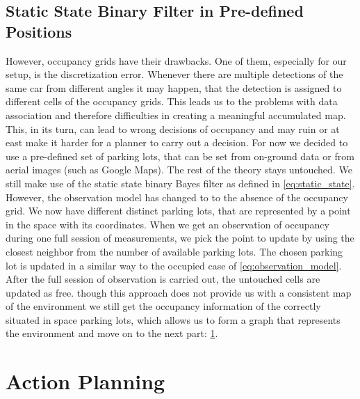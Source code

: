    \subsection{Static State Binary Filter in Pre-defined Positions} %
    \label{sub:static_state_binary_filter_in_pre_defined_positions}
        However, occupancy grids have their drawbacks. One of them, especially for our setup, is the discretization error. Whenever there are multiple detections of the same car from different angles it may happen, that the detection is assigned to different cells of the occupancy grids. This leads us to the problems with data association and therefore difficulties in creating a meaningful accumulated map. This, in its turn, can lead to wrong decisions of occupancy and may ruin or at east make it harder for a planner to carry out a decision.
        For now we decided to use a pre-defined set of parking lots, that can be set from on-ground data or from aerial images (such as Google Maps). The rest of the theory stays untouched. We still make use of the static state binary Bayes filter as defined in \ref{eq:static_state}. However, the observation model has changed to to the absence of the occupancy grid. We now have different distinct parking lots, that are represented by a point in the space with its coordinates. When we get an observation of occupancy during one full session of measurements, we pick the point to update by using the closest neighbor from the number of available parking lots. The chosen parking lot is updated in a similar way to the occupied case of \ref{eq:observation_model}. After the full session of observation is carried out, the untouched cells are updated as free.
        though this approach does not provide us with a consistent map of the environment we still get the occupancy information of the correctly situated in space parking lots, which allows us to form a graph that represents the environment and move on to the next part: \ref{sec:action_planning}.

\section{Action Planning} %
\label{sec:action_planning}

